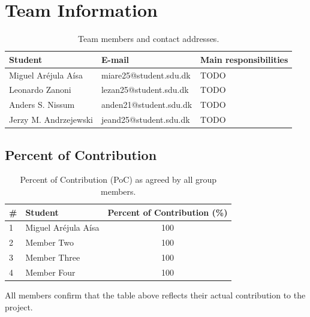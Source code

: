 \section*{Team Information}

\begin{table}[H]
\centering
\caption{Team members and contact addresses.}
\label{tab:team}
\begin{tabularx}{\textwidth}{@{}l X l@{}}
\toprule
\textbf{Student} & \textbf{E-mail} & \textbf{Main responsibilities} \\
\midrule
Miguel Aréjula Aísa & miare25@student.sdu.dk      & TODO \\
Leonardo Zanoni          & lezan25@student.sdu.dk   & TODO \\
Anders S. Nissum      & anden21@student.sdu.dk   & TODO \\
Jerzy M. Andrzejewski          & jeand25@student.sdu.dk   & TODO \\
\bottomrule
\end{tabularx}
\end{table}

\subsection*{Percent of Contribution}

\begin{table}[H]
\centering
\caption{Percent of Contribution (PoC) as agreed by all group members.}
\label{tab:poc}
\begin{tabular}{@{}llc@{}}
\toprule
\textbf{\#} & \textbf{Student} & \textbf{Percent of Contribution (\%)} \\
\midrule
1 & Miguel Aréjula Aísa & 100 \\
2 & Member Two          & 100 \\
3 & Member Three        & 100 \\
4 & Member Four         & 100 \\
\bottomrule
\end{tabular}
\end{table}

\noindent All members confirm that the table above reflects their actual contribution to the project.

\newpage
